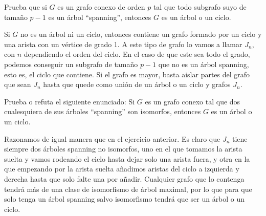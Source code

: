 \documentclass[twoside]{article}
\begin{document}
\newpage

\begin{ejercicio}{1.6}
Prueba que si $G$ es un grafo conexo de orden $p$ tal que todo subgrafo suyo de tamaño
$p -1$ es un árbol ``spanning'', entonces $G$ es un árbol o un ciclo.
\end{ejercicio}
\begin{solucion}
Si $G$ no es un árbol ni un ciclo, entonces contiene un grafo formado por un ciclo y una arista  con un vértice de grado 1. A este tipo de grafo lo vamos a llamar $J_n$, con $n$ dependiendo el orden del ciclo. En el caso de que este sea todo el grado, podemos conseguir un subgrafo de tamaño $p-1$ que no es un árbol spanning, esto es, el ciclo que contiene. Si el grafo es mayor, basta aislar partes del grafo que sean $J_n$ hasta que quede como unión de un árbol o un ciclo y grafos $J_n$.
\end{solucion}

\newpage

\begin{ejercicio}{1.7}
Prueba o refuta el siguiente enunciado: Si $G$ es un grafo conexo tal que dos cualesquiera
de sus árboles ``spanning'' son isomorfos, entonces $G$ es un árbol o un ciclo.
\end{ejercicio}
\begin{solucion}
Razonamos de igual manera que en el ejercicio anterior. Es claro que $J_n$ tiene siempre dos árboles spanning no isomorfos, uno en el que tomamos la arista suelta y vamos rodeando el ciclo hasta dejar solo una arista fuera, y otra en la que empezando por la arista suelta añadimos aristas del ciclo a izquierda y derecha hasta que solo falte una por añadir. Cualquier grafo que lo contenga tendrá más de una clase de isomorfismo de árbol maximal, por lo que para que solo tenga un árbol spanning salvo isomorfismo tendrá que ser un árbol o un ciclo. 
\end{solucion}

\newpage
\end{document}
